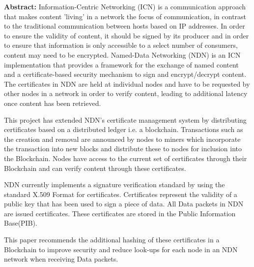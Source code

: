 \documentclass[a4paper, 12pt, oneside]{report}         %
\begin{document}
\begin{thesisabstract}

\textbf{Abstract:} Information-Centric Networking (ICN) is a communication approach that 
makes content 'living' in a network the focus of communication, in 
contrast to the traditional communication between hosts based on IP 
addresses. In order to ensure the validity of content, it should be 
signed by its producer and  in order to ensure that information is only 
accessible to a select number of consumers, content may need to be 
encrypted. Named-Data Networking (NDN) is an ICN implementation that 
provides a framework for the exchange of named content and a 
certificate-based security mechanism to sign and encrypt/decrypt 
content. The certificates in NDN are held at individual nodes and have 
to be requested by other nodes in a network in order to verify content, 
leading to additional latency once content has been retrieved.

This project has extended NDN's certificate management system by 
distributing certificates based on a distributed ledger i.e. a 
blockchain. Transactions such as the creation and removal are announced 
by nodes to miners which incorporate the transaction into new blocks and 
distribute these to nodes for inclusion into the Blockchain. Nodes have 
access to the current set of certificates through their Blockchain and 
can verify content through these certificates.

NDN currently implements a signature verification standard by using the standard X.509 Format for certificates. Certificates represent the validity of a public key that has been used to sign a piece of data. All Data packets in NDN are issued certificates. These certificates are stored in the Public Information Base(PIB).

This paper recommends the additional hashing of these certificates in a Blockchain to improve security and reduce look-ups for each node in an NDN network when receiving Data packets.
\end{thesisabstract}

\tableofcontents                                  %
\listoftables                                     %
\listoffigures                                    %

                                  
                                  
  
  
  
\end{document}
